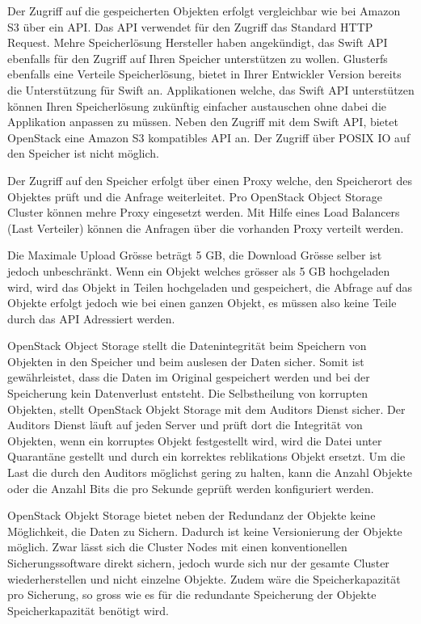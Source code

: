 Der Zugriff auf die gespeicherten Objekten erfolgt vergleichbar wie bei Amazon S3 über ein API. Das API verwendet für den Zugriff das Standard HTTP Request. Mehre Speicherlösung Hersteller haben angekündigt, das Swift API ebenfalls für den Zugriff auf Ihren Speicher unterstützen zu wollen. Glusterfs ebenfalls eine Verteile Speicherlösung, bietet in Ihrer Entwickler Version bereits die Unterstützung für Swift an. Applikationen welche, das Swift API unterstützen können Ihren Speicherlösung zukünftig einfacher austauschen ohne dabei die Applikation anpassen zu müssen. Neben den Zugriff mit dem Swift API, bietet OpenStack eine Amazon S3 kompatibles API an. Der Zugriff über POSIX IO auf den Speicher ist nicht möglich.

Der Zugriff auf den Speicher erfolgt über einen Proxy welche, den Speicherort des Objektes prüft und die Anfrage weiterleitet. Pro OpenStack Object Storage Cluster können mehre Proxy eingesetzt werden. Mit Hilfe eines Load Balancers (Last Verteiler) können die Anfragen über die vorhanden Proxy verteilt werden.

Die Maximale Upload Grösse beträgt 5 GB, die Download Grösse selber ist jedoch unbeschränkt. Wenn ein Objekt welches grösser als 5 GB hochgeladen wird, wird das Objekt in Teilen hochgeladen und gespeichert, die Abfrage auf das Objekte erfolgt jedoch wie bei einen ganzen Objekt, es müssen also keine Teile durch das API Adressiert werden.\cite{OpenStack2012a}



OpenStack Object Storage stellt die Datenintegrität beim Speichern von Objekten in den Speicher und beim auslesen der Daten sicher. Somit ist gewährleistet, dass die Daten im Original gespeichert werden und bei der Speicherung kein Datenverlust entsteht. Die Selbstheilung von korrupten Objekten, stellt OpenStack Objekt Storage mit dem Auditors Dienst sicher. Der Auditors Dienst läuft auf jeden Server und prüft dort die Integrität von Objekten, wenn ein korruptes Objekt festgestellt wird, wird die Datei unter Quarantäne gestellt und durch ein korrektes reblikations Objekt ersetzt.
Um die Last die durch den Auditors möglichst gering zu halten, kann die Anzahl Objekte oder die Anzahl Bits die pro Sekunde geprüft werden konfiguriert werden.\cite{OpenStack2012}



OpenStack Objekt Storage bietet neben der Redundanz der Objekte keine Möglichkeit, die Daten zu Sichern. Dadurch ist keine Versionierung der Objekte möglich. Zwar lässt sich die Cluster Nodes mit einen konventionellen Sicherungssoftware direkt sichern, jedoch wurde sich nur der gesamte Cluster wiederherstellen und nicht einzelne Objekte. Zudem wäre die Speicherkapazität pro Sicherung, so gross wie es für die redundante Speicherung der Objekte Speicherkapazität benötigt wird.
\cite{AndyBrezinsky2011}


